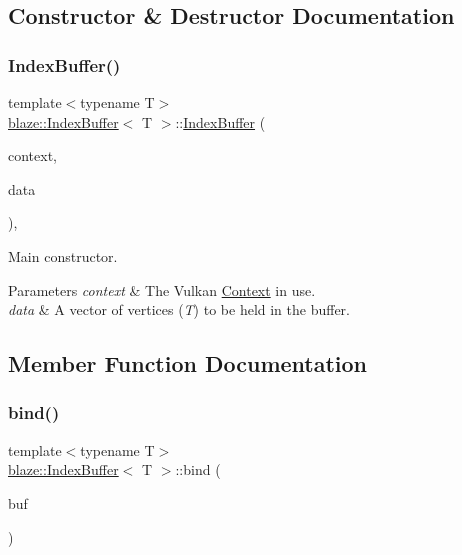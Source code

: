 \subsection{Constructor \& Destructor Documentation}
\mbox{\label{classblaze_1_1IndexBuffer_aa28bed3bd8c8bad8e2f3126c11709c21}} 
\subsubsection{\texorpdfstring{Index\+Buffer()}{IndexBuffer()}}
{\footnotesize\ttfamily template$<$typename T$>$ \\
\hyperlink{classblaze_1_1IndexBuffer}{blaze\+::\+Index\+Buffer}$<$ T $>$\+::\hyperlink{classblaze_1_1IndexBuffer}{Index\+Buffer} (\begin{DoxyParamCaption}\item[{const \hyperlink{classblaze_1_1Context}{Context} $\ast$}]{context,  }\item[{const std\+::vector$<$ T $>$ \&}]{data }\end{DoxyParamCaption})\hspace{0.3cm}{\ttfamily [inline]}, {\ttfamily [noexcept]}}



Main constructor. 


\begin{DoxyParams}{Parameters}
{\em context} & The Vulkan \hyperlink{classblaze_1_1Context}{Context} in use. \\
\hline
{\em data} & A vector of vertices ({\itshape T}) to be held in the buffer. \\
\hline
\end{DoxyParams}


\subsection{Member Function Documentation}
\mbox{\label{classblaze_1_1IndexBuffer_a51ce12bd53a32ca6e6dabb37a623a922}} 
\subsubsection{\texorpdfstring{bind()}{bind()}}
{\footnotesize\ttfamily template$<$typename T$>$ \\
\hyperlink{classblaze_1_1IndexBuffer}{blaze\+::\+Index\+Buffer}$<$ T $>$\+::bind (\begin{DoxyParamCaption}\item[{Vk\+Command\+Buffer}]{buf }\end{DoxyParamCaption})\hspace{0.3cm}{\ttfamily [inline]}}



